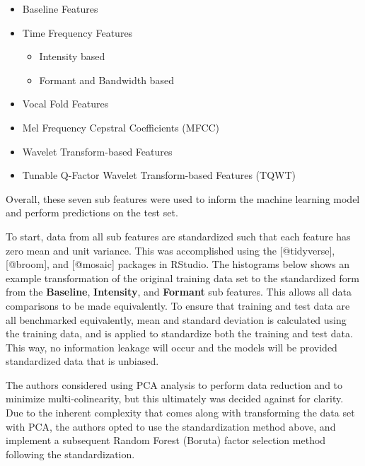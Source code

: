 \documentclass[
]{article}
\providecommand{\tightlist}{%
  \setlength{\itemsep}{0pt}\setlength{\parskip}{0pt}}
\begin{document}
\begin{itemize}
\tightlist
\item
  Baseline Features
\item
  Time Frequency Features

  \begin{itemize}
  \tightlist
  \item
    Intensity based
  \item
    Formant and Bandwidth based
  \end{itemize}
\item
  Vocal Fold Features
\item
  Mel Frequency Cepstral Coefficients (MFCC)
\item
  Wavelet Transform-based Features
\item
  Tunable Q-Factor Wavelet Transform-based Features (TQWT)
\end{itemize}

Overall, these seven sub features were used to inform the machine learning model and perform predictions on the test set.

To start, data from all sub features are standardized such that each feature has zero mean and unit variance. This was accomplished using the {[}@tidyverse{]}, {[}@broom{]}, and {[}@mosaic{]} packages in RStudio. The histograms below shows an example transformation of the original training data set to the standardized form from the \textbf{Baseline}, \textbf{Intensity}, and \textbf{Formant} sub features. This allows all data comparisons to be made equivalently. To ensure that training and test data are all benchmarked equivalently, mean and standard deviation is calculated using the training data, and is applied to standardize both the training and test data. This way, no information leakage will occur and the models will be provided standardized data that is unbiased.

The authors considered using PCA analysis to perform data reduction and to minimize multi-colinearity, but this ultimately was decided against for clarity. Due to the inherent complexity that comes along with transforming the data set with PCA, the authors opted to use the standardization method above, and implement a subsequent Random Forest (Boruta) factor selection method following the standardization.
\end{document}

